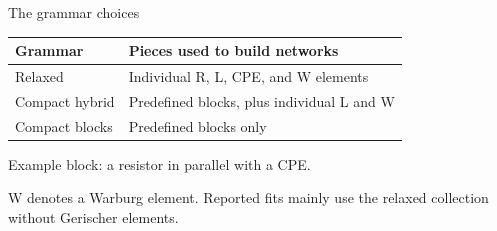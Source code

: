 \documentclass[aspectratio=169,12pt]{beamer}
\begin{document}
\begin{frame}{The grammar choices}
  \renewcommand{\arraystretch}{1.5}
  \begin{tabularx}{\textwidth}{@{}p{}X@{}}
    \toprule
    \textbf{Grammar} & \textbf{Pieces used to build networks} \\
    \midrule
    Relaxed & Individual R, L, CPE, and W elements \\
    Compact hybrid & Predefined blocks, plus individual L and W \\
    Compact blocks & Predefined blocks only \\
    \bottomrule
  \end{tabularx}

  \vspace{0.8em}
  Example block: a resistor in parallel with a CPE.

  \vspace{0.35em}
  W denotes a Warburg element. Reported fits mainly use the relaxed collection
  without Gerischer elements.
\end{frame}

\end{document}
